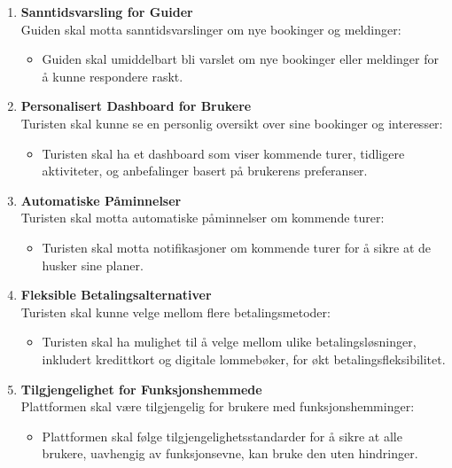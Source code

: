 \documentclass[../doc.tex]{subfiles}
\begin{document}
\begin{enumerate}
    \item \textbf{Sanntidsvarsling for Guider} \\
    Guiden skal motta sanntidsvarslinger om nye bookinger og meldinger:
    \begin{itemize}
        \item Guiden skal umiddelbart bli varslet om nye bookinger eller meldinger for å kunne respondere raskt.
    \end{itemize}

    \item \textbf{Personalisert Dashboard for Brukere} \\
    Turisten skal kunne se en personlig oversikt over sine bookinger og interesser:
    \begin{itemize}
        \item Turisten skal ha et dashboard som viser kommende turer, tidligere aktiviteter, og anbefalinger basert på brukerens preferanser.
    \end{itemize}

    \item \textbf{Automatiske Påminnelser} \\
    Turisten skal motta automatiske påminnelser om kommende turer:
    \begin{itemize}
        \item Turisten skal motta notifikasjoner om kommende turer for å sikre at de husker sine planer.
    \end{itemize}

    \item \textbf{Fleksible Betalingsalternativer} \\
    Turisten skal kunne velge mellom flere betalingsmetoder:
    \begin{itemize}
        \item Turisten skal ha mulighet til å velge mellom ulike betalingsløsninger, inkludert kredittkort og digitale lommebøker, for økt betalingsfleksibilitet.
    \end{itemize}

    \item \textbf{Tilgjengelighet for Funksjonshemmede} \\
    Plattformen skal være tilgjengelig for brukere med funksjonshemminger:
    \begin{itemize}
        \item Plattformen skal følge tilgjengelighetsstandarder for å sikre at alle brukere, uavhengig av funksjonsevne, kan bruke den uten hindringer.
    \end{itemize}


\end{enumerate}
\end{document}
